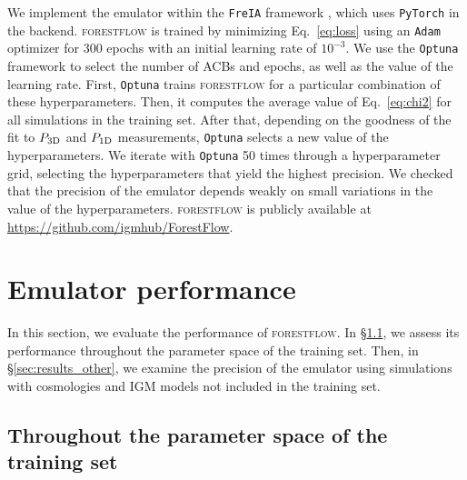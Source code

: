 \documentclass{aa}
\newcommand{\poned}{\ensuremath{P_{\rm 1D}}\xspace}
\newcommand{\pthreed}{\ensuremath{P_{\rm 3D}}\xspace}
\newcommand{\forestflow}{\textsc{forestflow}\xspace}
\begin{document}
We implement the emulator within the \texttt{FreIA} framework \citep{freia}, which uses \texttt{PyTorch} \citep{Ansel_PyTorch_2_Faster_2024} in the backend.  \forestflow is trained by minimizing Eq.~\ref{eq:loss} using an \texttt{Adam} optimizer \citep{adam_Diederik2015} for 300 epochs with an initial learning rate of $10^{-3}$. We use the \texttt{Optuna} framework \citep{optuna_2019} to select the number of ACBs and epochs, as well as the value of the learning rate. First, \texttt{Optuna} trains \forestflow for a particular combination of these hyperparameters. Then, it computes the average value of Eq.~\ref{eq:chi2} for all simulations in the training set. After that, depending on the goodness of the fit to \pthreed and \poned measurements, \texttt{Optuna} selects a new value of the hyperparameters. We iterate with \texttt{Optuna} 50 times through a hyperparameter grid, selecting the hyperparameters that yield the highest precision. We checked that the precision of the emulator depends weakly on small variations in the value of the hyperparameters. \forestflow is publicly available at \url{https://github.com/igmhub/ForestFlow}.


\section{Emulator performance}
\label{sec:results}


In this section, we evaluate the performance of \forestflow. In \S\ref{sec:results_statistics}, we assess its performance throughout the parameter space of the training set. Then, in \S\ref{sec:results_other}, we examine the precision of the emulator using simulations with cosmologies and IGM models not included in the training set.


\subsection{Throughout the parameter space of the training set}
\label{sec:results_statistics}
\end{document}
